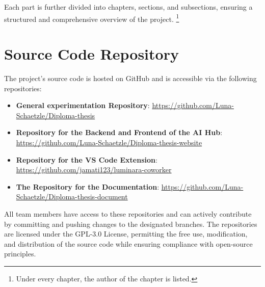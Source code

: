 Each part is further divided into chapters, sections, and subsections, ensuring a structured and comprehensive overview of the project.
\footnote{Under every chapter, the author of the chapter is listed.}


\section{Source Code Repository}

The project's source code is hosted on GitHub and is accessible via the following repositories:

\begin{itemize}
    \item \textbf{General experimentation Repository}: \url{https://github.com/Luna-Schaetzle/Diploma-thesis}
    \item \textbf{Repository for the Backend and Frontend of the AI Hub}: \url{https://github.com/Luna-Schaetzle/Diploma-thesis-website}
    \item \textbf{Repository for the VS Code Extension}: \url{https://github.com/jamati123/luminara-coworker}
    \item \textbf{The Repository for the Documentation}: \url{https://github.com/Luna-Schaetzle/Diploma-thesis-document}
\end{itemize}

All team members have access to these repositories and can actively contribute by committing and pushing changes to the designated branches. The repositories are licensed under the GPL-3.0 License, permitting the free use, modification, and distribution of the source code while ensuring compliance with open-source principles.